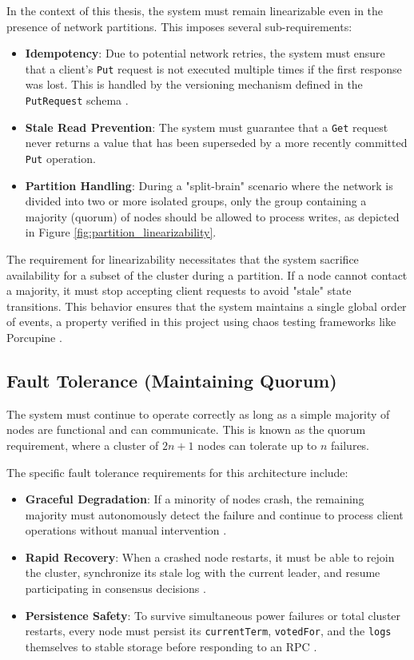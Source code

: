 In the context of this thesis, the system must remain linearizable even in the presence of network partitions. This imposes several sub-requirements:
\begin{itemize}
    \item \textbf{Idempotency}: Due to potential network retries, the system must ensure that a client's \texttt{Put} request is not executed multiple times if the first response was lost. This is handled by the versioning mechanism defined in the \texttt{PutRequest} schema \cite{10}.
    \item \textbf{Stale Read Prevention}: The system must guarantee that a \texttt{Get} request never returns a value that has been superseded by a more recently committed \texttt{Put} operation.
    \item \textbf{Partition Handling}: During a "split-brain" scenario where the network is divided into two or more isolated groups, only the group containing a majority (quorum) of nodes should be allowed to process writes, as depicted in Figure \ref{fig:partition_linearizability}.
\end{itemize}

The requirement for linearizability necessitates that the system sacrifice availability for a subset of the cluster during a partition.
If a node cannot contact a majority, it must stop accepting client requests to avoid "stale" state transitions. This behavior ensures that the system maintains a single global order of events, a property verified in this project using chaos testing frameworks like Porcupine \cite{27}.

\subsection{Fault Tolerance (Maintaining Quorum)}
The system must continue to operate correctly as long as a simple majority of nodes are functional and can communicate. This is known as the quorum requirement, where a cluster of $2n+1$ nodes can tolerate up to $n$ failures.

The specific fault tolerance requirements for this architecture include:
\begin{itemize}
    \item \textbf{Graceful Degradation}: If a minority of nodes crash, the remaining majority must autonomously detect the failure and continue to process client operations without manual intervention \cite{2}.
    \item \textbf{Rapid Recovery}: When a crashed node restarts, it must be able to rejoin the cluster, synchronize its stale log with the current leader, and resume participating in consensus decisions \cite{2}.
    \item \textbf{Persistence Safety}: To survive simultaneous power failures or total cluster restarts, every node must persist its \texttt{currentTerm}, \texttt{votedFor}, and the \texttt{logs} themselves to stable storage before responding to an RPC \cite{1, 2}.
\end{itemize}

